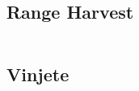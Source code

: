 \subsection{Range Harvest}

\hrulefill \vspace{-\baselineskip}
\begin{multicols}{2}
\inputminted[autogobble,fontsize=\tiny]{C++}{Solutions/range_harvest.cpp}
\end{multicols}
\vspace{-\baselineskip}
\noindent \hrulefill

\subsection{Vinjete}

\hrulefill \vspace{-\baselineskip}
\begin{multicols}{2}
\inputminted[autogobble,fontsize=\tiny]{C++}{Solutions/vinjete.cpp}
\end{multicols}
\vspace{-\baselineskip}
\noindent \hrulefill